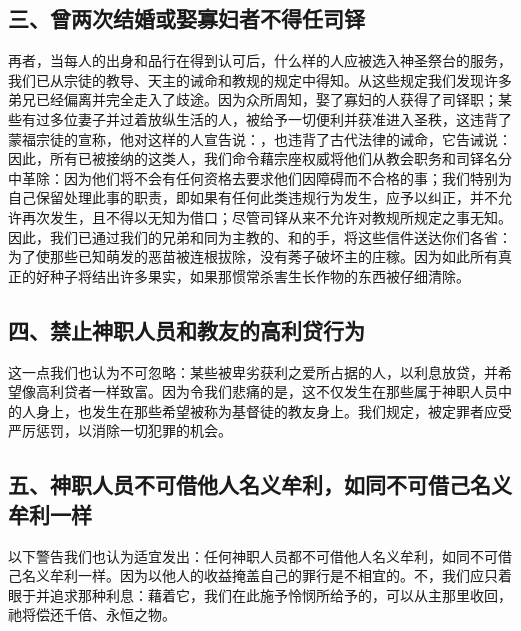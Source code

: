 \subsection{三、曾两次结婚或娶寡妇者不得任司铎}

再者，当每人的出身和品行在得到认可后，什么样的人应被选入神圣祭台的服务，我们已从宗徒的教导、天主的诫命和教规的规定中得知。从这些规定我们发现许多弟兄已经偏离并完全走入了歧途。因为众所周知，娶了寡妇的人获得了司铎职；某些有过多位妻子并过着放纵生活的人，被给予一切便利并获准进入圣秩，这违背了蒙福宗徒的宣称，他对这样的人宣告说：，也违背了古代法律的诫命，它告诫说：因此，所有已被接纳的这类人，我们命令藉宗座权威将他们从教会职务和司铎名分中革除：因为他们将不会有任何资格去要求他们因障碍而不合格的事；我们特别为自己保留处理此事的职责，即如果有任何此类违规行为发生，应予以纠正，并不允许再次发生，且不得以无知为借口；尽管司铎从来不允许对教规所规定之事无知。因此，我们已通过我们的兄弟和同为主教的、和的手，将这些信件送达你们各省：为了使那些已知萌发的恶苗被连根拔除，没有莠子破坏主的庄稼。因为如此所有真正的好种子将结出许多果实，如果那惯常杀害生长作物的东西被仔细清除。\par


\subsection{四、禁止神职人员和教友的高利贷行为}

这一点我们也认为不可忽略：某些被卑劣获利之爱所占据的人，以利息放贷，并希望像高利贷者一样致富。因为令我们悲痛的是，这不仅发生在那些属于神职人员中的人身上，也发生在那些希望被称为基督徒的教友身上。我们规定，被定罪者应受严厉惩罚，以消除一切犯罪的机会。\par


\subsection{五、神职人员不可借他人名义牟利，如同不可借己名义牟利一样}

以下警告我们也认为适宜发出：任何神职人员都不可借他人名义牟利，如同不可借己名义牟利一样。因为以他人的收益掩盖自己的罪行是不相宜的。不，我们应只着眼于并追求那种利息：藉着它，我们在此施予怜悯所给予的，可以从主那里收回，祂将偿还千倍、永恒之物。\par


